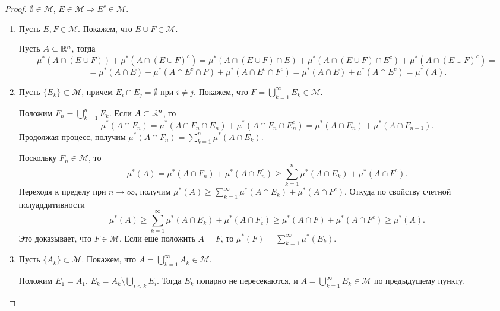 \begin{proof}
    $\emptyset \in \mathcal{M}$, $E \in \mathcal{M} \Rightarrow E^{c} \in \mathcal{M}$.

    \begin{enumerate}
        \item Пусть $E, F \in \mathcal{M}$. Покажем, что $E \cup F \in \mathcal{M}$.

        Пусть $A \subset \mathbb{R}^{n}$, тогда
        \[\mu^{*}(A \cap (E \cup F)) + \mu^{*}(A \cap (E \cup F)^{c}) = \mu^{*}(A \cap (E \cup F) \cap E) + \mu^{*}(A \cap (E \cup F) \cap E^{c}) + \mu^{*}(A \cap (E \cup F)^{c}) =\] \[= \mu^{*}(A \cap E) + \mu^{*}(A \cap E^{c} \cap F) + \mu^{*}(A \cap E^{c} \cap F^{c}) = \mu^{*}(A \cap E) + \mu^{*}(A \cap E^{c}) = \mu^{*}(A).\]

        \item Пусть $\{E_{k}\} \subset \mathcal{M}$, причем $E_{i} \cap E_{j} = \emptyset$ при $i \neq j$. Покажем, что $F = \bigcup_{k = 1}^{\infty} E_{k} \in \mathcal{M}$.

        Положим $F_{n} = \bigcup_{k = 1}^{n}E_{k}$. Если $A \subset \mathbb{R}^n$, то
        \[\mu^{*}(A \cap F_{n}) = \mu^{*}(A \cap F_{n} \cap E_{n}) + \mu^{*}(A \cap F_{n} \cap E_{n}^{c}) = \mu^{*}(A \cap E_{n}) + \mu^{*}(A \cap F_{n - 1}).\]
        Продолжая процесс, получим $\mu^{*}(A \cap F_{n}) = \sum_{k = 1}^{n}\mu^{*}(A \cap E_{k})$.

        Поскольку $F_{n} \in \mathcal{M}$, то
        \[\mu^{*}(A) = \mu^{*}(A \cap F_{n}) + \mu^{*}(A \cap F_{n}^{c}) \geq \sum_{k = 1}^{n} \mu^{*}(A \cap E_{k}) + \mu^{*}(A \cap F^{c}).\]
        Переходя к пределу при $n \to \infty$, получим $\mu^{*}(A) \geq \sum_{k = 1}^{\infty}\mu^{*}(A \cap E_{k}) + \mu^{*}(A \cap F^{c})$. Откуда по свойству счетной полуаддитивности
        \[\mu^{*}(A) \geq \sum_{k = 1}^{\infty}\mu^{*}(A \cap E_{k}) + \mu^{*}(A \cap F_{c}) \geq \mu^{*}(A \cap F) + \mu^{*}(A \cap F^{c}) \geq \mu^{*}(A).\]
        Это доказывает, что $F \in \mathcal{M}$. Если еще положить $A = F$, то $\mu^{*}(F) = \sum_{k = 1}^{\infty}\mu^{*}(E_{k})$.

        \item Пусть $\{A_{k}\} \subset \mathcal{M}$. Покажем, что $A = \bigcup_{k = 1}^{\infty}A_{k} \in \mathcal{M}$.

        Положим $E_{1} = A_{1}$, $E_{k} = A_{k} \setminus \bigcup_{i < k} E_{i}$. Тогда $E_{k}$ попарно не пересекаются, и $A = \bigcup_{k = 1}^{\infty}E_{k} \in \mathcal{M}$ по предыдущему пункту.
    \end{enumerate}
\end{proof}

